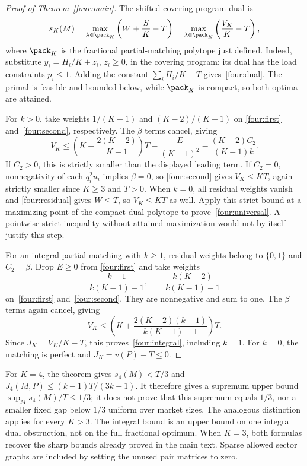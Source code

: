 \begin{proof}[Proof of Theorem~\ref{four:main}]
The shifted covering-program dual is
\begin{equation}\label{four:dual}
 s_K(M)=\max_{\lambda\in\pack_K}\left(W+\frac SK-T\right)
       =\max_{\lambda\in\pack_K}\left(\frac{V_K}{K}-T\right),
\end{equation}
where $\pack_K$ is the fractional partial-matching polytope just defined.
Indeed, substitute $y_i=H_i/K+z_i$, $z_i\ge0$, in the covering program;
its dual has the load constraints $p_i\le1$. Adding the constant
$\sum_iH_i/K-T$ gives~\eqref{four:dual}. The primal is feasible and
bounded below, while $\pack_K$ is compact, so both optima are attained.

For $k>0$, take weights $1/(K-1)$ and $(K-2)/(K-1)$ on
\eqref{four:first} and~\eqref{four:second}, respectively. The
$\beta$ terms cancel, giving
\begin{equation}\label{four:fractional-combination}
 V_K\le\left(K+\frac{2(K-2)}{K-1}\right)T
         -\frac{E}{(K-1)^2}
         -\frac{(K-2)C_2}{(K-1)k}.
\end{equation}
If $C_2>0$, this is strictly smaller than the displayed leading term.
If $C_2=0$, nonnegativity of each $q_i^2u_i$ implies $\beta=0$, so
\eqref{four:second} gives $V_K\le KT$, again strictly smaller since
$K\ge3$ and $T>0$. When $k=0$, all residual weights vanish and
\eqref{four:residual} gives $W\le T$, so $V_K\le KT$ as well.
Apply this strict bound at a maximizing point of the compact dual
polytope to prove~\eqref{four:universal}. A pointwise strict inequality
without attained maximization would not by itself justify this step.

For an integral partial matching with $k\ge1$, residual weights belong
to $\{0,1\}$ and $C_2=\beta$. Drop $E\ge0$ from
\eqref{four:first} and take weights
\[
       \frac{k-1}{k(K-1)-1},\qquad
       \frac{k(K-2)}{k(K-1)-1}
\]
on~\eqref{four:first} and~\eqref{four:second}. They are nonnegative
and sum to one. The $\beta$ terms again cancel, giving
\[
       V_K\le\left(K+
           \frac{2(K-2)(k-1)}{k(K-1)-1}\right)T.
\]
Since $J_K=V_K/K-T$, this proves~\eqref{four:integral}, including
$k=1$. For $k=0$, the matching is perfect and $J_K=v(P)-T\le0$.
\end{proof}

\begin{remark}\label{four:scope}
For $K=4$, the theorem gives $s_4(M)<T/3$ and
$J_4(M,P)\le(k-1)T/(3k-1)$. It therefore gives a supremum upper bound
$\sup_M s_4(M)/T\le1/3$; it does not prove that this supremum equals
$1/3$, nor a smaller fixed gap below $1/3$ uniform over market sizes.
The analogous distinction applies for every $K>3$. The integral bound
is an upper bound on one integral dual obstruction, not on the full
fractional optimum. When $K=3$, both formulas recover the sharp bounds
already proved in the main text. Sparse allowed sector graphs are
included by setting the unused pair matrices to zero.
\end{remark}


